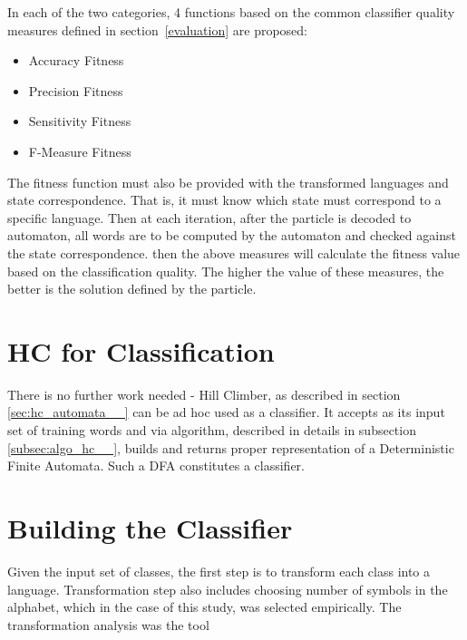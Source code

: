 \documentclass{mini}
\begin{document}
In each of the two categories, 4 functions based on the common classifier quality measures defined in section~\ref{evaluation} are proposed:
\begin{itemize}
    \item Accuracy Fitness
    \item Precision Fitness
    \item Sensitivity Fitness
    \item F-Measure Fitness
\end{itemize}

The fitness function must also be provided with the transformed languages and state correspondence. That is, it must know which state must correspond to a specific language. Then at each iteration, after the particle is decoded to automaton, all words are to be computed by the automaton and checked against the state correspondence. then the above measures will calculate the fitness value based on the classification quality. The higher the value of these measures, the better is the solution defined by the particle.

\section{HC for Classification}
There is no further work needed - Hill Climber, as described in section \ref{sec:hc_automata__} can be ad hoc used as a classifier. It accepts as its input set of training words and via algorithm, described in details in subsection \ref{subsec:algo_hc__}, builds and returns proper representation of a Deterministic Finite Automata. Such a DFA constitutes a classifier.

\section{Building the Classifier}\label{sec:classification_transf_step}
Given the input set of classes, the first step is to transform each class into a language. Transformation step also includes choosing number of symbols in the alphabet, which in the case of this study, was selected empirically. The transformation analysis was the tool 



\end{document}
